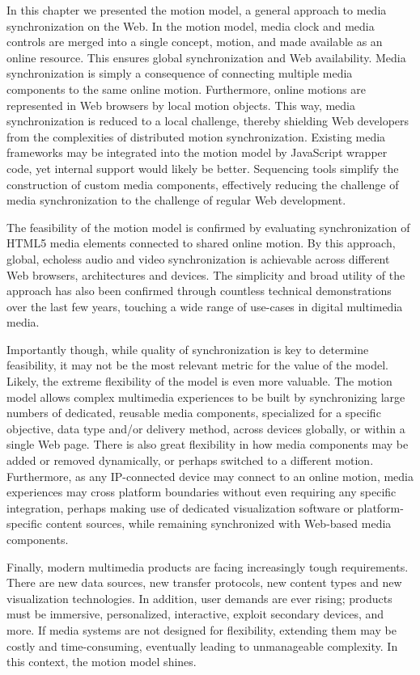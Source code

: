 In this chapter we presented the motion model, a general approach to media
synchronization on the Web. In the motion model, media clock and media
controls are merged into a single concept, motion, and made available as an
online resource. This ensures global synchronization and Web availability.
Media synchronization is simply a consequence of connecting multiple media
components to the same online motion. Furthermore, online motions are
represented in Web browsers by local motion objects. This way, media
synchronization is reduced to a local challenge, thereby shielding Web
developers from the complexities of distributed motion synchronization.
Existing media frameworks may be integrated into the motion model by
JavaScript wrapper code, yet internal support would likely be better.
Sequencing tools simplify the construction of custom media components,
effectively reducing the challenge of media synchronization to the challenge
of regular Web development.

The feasibility of the motion model is confirmed by evaluating synchronization
of HTML5 media elements connected to shared online motion. By this approach,
global, echoless audio and video synchronization is achievable across
different Web browsers, architectures and devices. The simplicity and broad
utility of the approach has also been confirmed through countless technical
demonstrations over the last few years, touching a wide range of use-cases in
digital multimedia media.

Importantly though, while quality of synchronization is key to determine
feasibility, it may not be the most relevant metric for the value of the
model. Likely, the extreme flexibility of the model is even more valuable. The
motion model allows complex multimedia experiences to be built by
synchronizing large numbers of dedicated, reusable media components,
specialized for a specific objective, data type and/or delivery method, across
devices globally, or within a single Web page. There is also great flexibility
in how media components may be added or removed dynamically, or perhaps
switched to a different motion. Furthermore, as any IP-connected device may
connect to an online motion, media experiences may cross platform boundaries
without even requiring any specific integration, perhaps making use of
dedicated visualization software or platform-specific content sources, while
remaining synchronized with Web-based media components.

Finally, modern multimedia products are facing increasingly tough
requirements. There are new data sources, new transfer protocols, new content
types and new visualization technologies. In addition, user demands are ever
rising; products must be immersive, personalized, interactive, exploit
secondary devices, and more. If media systems are not designed for
flexibility, extending them may be costly and time-consuming, eventually
leading to unmanageable complexity. In this context, the motion model shines.
